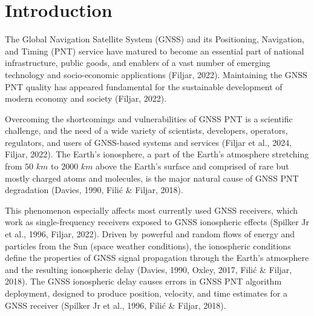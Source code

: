 \documentclass[sn-mathphys-num]{sn-jnl}%
\begin{document}



\maketitle

\section{Introduction}

The Global Navigation Satellite System (GNSS) and its Positioning, Navigation, and Timing (PNT) service have matured to become an essential part of national infrastructure, public goods, and enablers of a vast number of emerging technology and socio-economic applications (Filjar, 2022). Maintaining the GNSS PNT quality has appeared fundamental for the sustainable development of modern economy and society (Filjar, 2022). 

Overcoming the shortcomings and vulnerabilities of GNSS PNT is a scientific challenge, and the need of a wide variety of scientists, developers, operators, regulators, and users of GNSS-based systems and services (Filjar et al., 2024, Filjar, 2022). The Earth’s ionosphere, a part of the Earth’s atmosphere stretching from $50$ $km$ to $2000$ $km$ above the Earth’s surface and comprised of rare but mostly charged atoms and molecules, is the major natural cause of GNSS PNT degradation (Davies, 1990, Filić & Filjar, 2018).

This phenomenon especially affects most currently used GNSS receivers, which work as single-frequency receivers exposed to GNSS ionospheric effects (Spilker Jr et al., 1996, Filjar, 2022). Driven by powerful and random flows of energy and particles from the Sun (space weather conditions), the ionospheric conditions define the properties of GNSS signal propagation through the Earth’s atmosphere and the resulting ionospheric delay (Davies, 1990, Oxley, 2017, Filić & Filjar, 2018). The GNSS ionospheric delay causes errors in GNSS PNT algorithm deployment, designed to produce position, velocity, and time estimates for a GNSS receiver (Spilker Jr et al., 1996, Filić & Filjar, 2018). 
\end{document}
